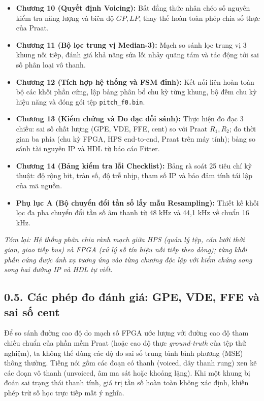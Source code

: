 \begin{itemize}[leftmargin=1.5em, itemsep=2pt]
    \item \textbf{Chương 10 (Quyết định Voicing):} Bất đẳng thức nhân chéo số nguyên kiểm tra năng lượng và biên độ $GP, LP$, thay thế hoàn toàn phép chia số thực của Praat.
    \item \textbf{Chương 11 (Bộ lọc trung vị Median-3):} Mạch so sánh lọc trung vị 3 khung nối tiếp, đánh giá khả năng sửa lỗi nhảy quãng tám và tác động tới sai số phân loại vô thanh.
    \item \textbf{Chương 12 (Tích hợp hệ thống và FSM đỉnh):} Kết nối liên hoàn toàn bộ các khối phần cứng, lập bảng phân bổ chu kỳ từng khung, bộ đếm chu kỳ hiệu năng và đóng gói tệp \texttt{pitch\_f0.bin}.
    \item \textbf{Chương 13 (Kiểm chứng và Đo đạc đối sánh):} Thực hiện đo đạc 3 chiều: sai số chất lượng (GPE, VDE, FFE, cent) so với Praat $R_1, R_2$; đo thời gian ba phía (chu kỳ FPGA, HPS end-to-end, Praat trên máy tính); bảng so sánh tài nguyên IP và HDL từ báo cáo Fitter.
    \item \textbf{Chương 14 (Bảng kiểm tra lỗi Checklist):} Bảng rà soát 25 tiêu chí kỹ thuật: độ rộng bit, tràn số, độ trễ nhịp, tham số IP và bảo đảm tính tái lập của mã nguồn.
    \item \textbf{Phụ lục A (Bộ chuyển đổi tần số lấy mẫu Resampling):} Thiết kế khối lọc đa pha chuyển đổi tần số âm thanh từ 48 kHz và 44,1 kHz về chuẩn 16 kHz.
\end{itemize}

\textit{Tóm lại: Hệ thống phân chia rành mạch giữa HPS (quản lý tệp, căn lưới thời gian, giao tiếp bus) và FPGA (xử lý số tín hiệu nối tiếp theo dòng); từng khối phần cứng được ánh xạ tương ứng vào từng chương độc lập với kiểm chứng song song hai đường IP và HDL tự viết.}

\subsection*{0.5. Các phép đo đánh giá: GPE, VDE, FFE và sai số cent}

Để so sánh đường cao độ do mạch số FPGA ước lượng với đường cao độ tham chiếu chuẩn của phần mềm Praat (hoặc cao độ thực \emph{ground-truth} của tệp thử nghiệm), ta không thể dùng các độ đo sai số trung bình bình phương (MSE) thông thường. Tiếng nói gồm các đoạn có thanh (voiced, dây thanh rung) xen kẽ các đoạn vô thanh (unvoiced, âm ma sát hoặc khoảng lặng). Khi một khung bị đoán sai trạng thái thanh tính, giá trị tần số hoàn toàn không xác định, khiến phép trừ số học trực tiếp mất ý nghĩa.

